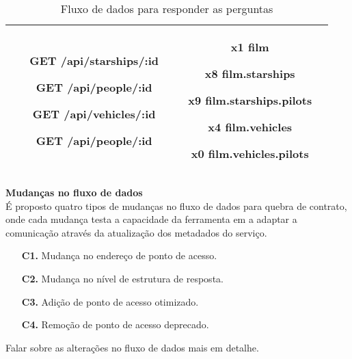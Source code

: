 \begin{table}[H]
\begin{tabular}{|c|c|c|}
\begin{minipage}[t]{0.4\textwidth}
\begin{itemize}
        \item[\textbf{GET}] /api/starships/:id
        \item[\textbf{GET}] /api/people/:id
        \item[\textbf{GET}] /api/vehicles/:id
        \item[\textbf{GET}] /api/people/:id
      \end{itemize}
    \end{minipage} & \begin{minipage}[t]{0.4\textwidth}
      \begin{itemize}
        \item[\textbf{x1}] film
        \item[\textbf{x8}] film.starships
        \item[\textbf{x9}] film.starships.pilots
        \item[\textbf{x4}] film.vehicles
        \item[\textbf{x0}] film.vehicles.pilots
      \end{itemize}
    \end{minipage} \\
    \hline
  \end{tabular}
  \caption{Fluxo de dados para responder as perguntas}
\end{table}

\textbf{Mudanças no fluxo de dados} \\

É proposto quatro tipos de mudanças no fluxo de dados para quebra de contrato, onde cada mudança testa a capacidade da ferramenta em a adaptar a comunicação através da atualização dos metadados do serviço.

\begin{enumerate}
\item[\textbf{C1.}] Mudança no endereço de ponto de acesso.
\item[\textbf{C2.}] Mudança no nível de estrutura de resposta.
\item[\textbf{C3.}] Adição de ponto de acesso otimizado.
\item[\textbf{C4.}] Remoção de ponto de acesso deprecado.
\end{enumerate}

Falar sobre as alterações no fluxo de dados mais em detalhe.

